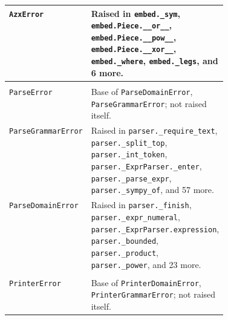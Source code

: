 {\begin{xltabular}{\linewidth}{@{}>{\raggedright\arraybackslash}p{0.42\linewidth}X@{}}
\texttt{AzxError}\newline{} & Raised in \texttt{embed.\allowbreak{}\_\allowbreak{}sym}, \texttt{embed.\allowbreak{}Piece.\allowbreak{}\_\allowbreak{}\_\allowbreak{}or\_\allowbreak{}\_\allowbreak{}}, \texttt{embed.\allowbreak{}Piece.\allowbreak{}\_\allowbreak{}\_\allowbreak{}pow\_\allowbreak{}\_\allowbreak{}}, \texttt{embed.\allowbreak{}Piece.\allowbreak{}\_\allowbreak{}\_\allowbreak{}xor\_\allowbreak{}\_\allowbreak{}}, \texttt{embed.\allowbreak{}\_\allowbreak{}where}, \texttt{embed.\allowbreak{}\_\allowbreak{}legs}, and 6 more. \\
\midrule
{}\\*
\texttt{ParseError}\newline{} & Base of \texttt{ParseDomainError}, \texttt{ParseGrammarError}; not raised itself. \\
\texttt{ParseGrammarError}\newline{} & Raised in \texttt{parser.\allowbreak{}\_\allowbreak{}require\_\allowbreak{}text}, \texttt{parser.\allowbreak{}\_\allowbreak{}split\_\allowbreak{}top}, \texttt{parser.\allowbreak{}\_\allowbreak{}int\_\allowbreak{}token}, \texttt{parser.\allowbreak{}\_\allowbreak{}ExprParser.\allowbreak{}\_\allowbreak{}enter}, \texttt{parser.\allowbreak{}\_\allowbreak{}parse\_\allowbreak{}expr}, \texttt{parser.\allowbreak{}\_\allowbreak{}sympy\_\allowbreak{}of}, and 57 more. \\
\texttt{ParseDomainError}\newline{} & Raised in \texttt{parser.\allowbreak{}\_\allowbreak{}finish}, \texttt{parser.\allowbreak{}\_\allowbreak{}expr\_\allowbreak{}numeral}, \texttt{parser.\allowbreak{}\_\allowbreak{}ExprParser.\allowbreak{}expression}, \texttt{parser.\allowbreak{}\_\allowbreak{}bounded}, \texttt{parser.\allowbreak{}\_\allowbreak{}product}, \texttt{parser.\allowbreak{}\_\allowbreak{}power}, and 23 more. \\
\midrule
{}\\*
\texttt{PrinterError}\newline{} & Base of \texttt{PrinterDomainError}, \texttt{PrinterGrammarError}; not raised itself. \\

\end{xltabular}}
